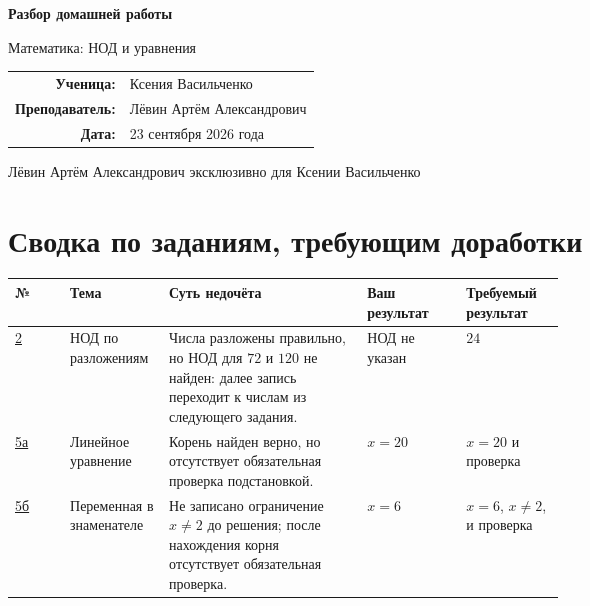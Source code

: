 \documentclass[a4paper,12pt]{article}
\begin{document}
\begin{titlepage}
\thispagestyle{empty}
\centering
\vspace*{0.16\textheight}
{\Huge\bfseries Разбор домашней работы\par}
\vspace{0.7cm}
{\Large Математика: НОД и уравнения\par}
\vspace{1.6cm}
\begin{tabular}{@{}rl@{}}
\textbf{Ученица:} & Ксения Васильченко \\
\textbf{Преподаватель:} & Лёвин Артём Александрович \\
\textbf{Дата:} & 23 сентября 2026 года
\end{tabular}
\vfill
{\small\color{Muted}Лёвин Артём Александрович эксклюзивно для Ксении Васильченко\par}
\vspace{0.55cm}
\vspace{0.25cm}
\end{titlepage}

\newpage
\section*{Сводка по заданиям, требующим доработки}
\small
\begin{tabularx}{\linewidth}{@{}p{0.10\linewidth}p{0.18\linewidth}Yp{0.18\linewidth}p{0.18\linewidth}@{}}
\toprule
\textbf{№} & \textbf{Тема} & \textbf{Суть недочёта} & \textbf{Ваш результат} & \textbf{Требуемый результат} \\
\midrule
\hyperref[task:2]{2} & НОД по разложениям & Числа разложены правильно, но НОД для $72$ и $120$ не найден: далее запись переходит к числам из следующего задания. & НОД не указан & $24$ \\
\addlinespace
\hyperref[task:5a]{5а} & Линейное уравнение & Корень найден верно, но отсутствует обязательная проверка подстановкой. & $x=20$ & $x=20$ и проверка \\
\addlinespace
\hyperref[task:5b]{5б} & Переменная в знаменателе & Не записано ограничение $x\ne2$ до решения; после нахождения корня отсутствует обязательная проверка. & $x=6$ & $x=6$, $x\ne2$, и проверка \\
\bottomrule
\end{tabularx}
\normalsize
\end{document}
